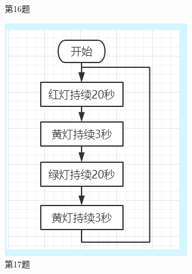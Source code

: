 \documentclass[10pt, a4paper]{article}
\begin{document}
\begin{enumerate}
\begin{figure}[htbp]
\begin{minipage}[t]{.1\textwidth}
                \caption*{第16题}
            \end{minipage}
            \begin{minipage}[t]{.18\textwidth}
                \centering
                \includegraphics[width=\textwidth]{17.png}
                \caption*{第17题}
            \end{minipage}
            \begin{minipage}[t]{.2\textwidth}
                \centering

\end{minipage}
\end{figure}
\end{enumerate}
\end{document}
